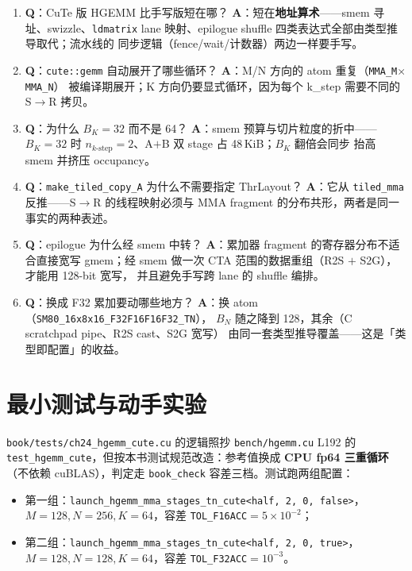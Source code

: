 \begin{enumerate}
  \item \textbf{Q}：CuTe 版 HGEMM 比手写版短在哪？
        \textbf{A}：短在\textbf{地址算术}——smem 寻址、swizzle、\texttt{ldmatrix}
        lane 映射、epilogue shuffle 四类表达式全部由类型推导取代；流水线的
        同步逻辑（fence/wait/计数器）两边一样要手写。
  \item \textbf{Q}：\texttt{cute::gemm} 自动展开了哪些循环？
        \textbf{A}：M/N 方向的 atom 重复（\texttt{MMA\_M}$\times$\texttt{MMA\_N}）
        被编译期展开；K 方向仍要显式循环，因为每个 k\_step 需要不同的
        S$\to$R 拷贝。
  \item \textbf{Q}：为什么 $B_K=32$ 而不是 64？
        \textbf{A}：smem 预算与切片粒度的折中——$B_K=32$ 时
        $n_{k\text{-step}}=2$、A$+$B 双 stage 占 48\,KiB；$B_K$ 翻倍会同步
        抬高 smem 并挤压 occupancy。
  \item \textbf{Q}：\texttt{make\_\allowbreak{}tiled\_\allowbreak{}copy\_\allowbreak{}A} 为什么不需要指定
        ThrLayout？
        \textbf{A}：它从 \texttt{tiled\_mma} 反推——S$\to$R 的线程映射必须与
        MMA fragment 的分布共形，两者是同一事实的两种表述。
  \item \textbf{Q}：epilogue 为什么经 smem 中转？
        \textbf{A}：累加器 fragment 的寄存器分布不适合直接宽写 gmem；经 smem
        做一次 CTA 范围的数据重组（R2S $+$ S2G），才能用 128-bit 宽写，
        并且避免手写跨 lane 的 shuffle 编排。
  \item \textbf{Q}：换成 F32 累加要动哪些地方？
        \textbf{A}：换 atom（\texttt{SM80\_\allowbreak{}16x8x16\_\allowbreak{}F32\allowbreak{}F16\allowbreak{}F16\allowbreak{}F32\_\allowbreak{}TN}），
        $B_N$ 随之降到 128，其余（C scratchpad pipe、R2S cast、S2G 宽写）
        由同一套类型推导覆盖——这是「类型即配置」的收益。
\end{enumerate}

\section{最小测试与动手实验}\label{sec:24-minitest}

\texttt{book/\allowbreak{}tests/\allowbreak{}ch24\_\allowbreak{}hgemm\_\allowbreak{}cute.cu} 的逻辑照抄 \texttt{bench/hgemm.cu}
L192 的 \texttt{test\_\allowbreak{}hgemm\_\allowbreak{}cute}，但按本书测试规范改造：参考值换成
\textbf{CPU fp64 三重循环}（不依赖 cuBLAS），判定走 \texttt{book\_check}
容差三档。测试跑两组配置：

\begin{itemize}
  \item 第一组：\texttt{launch\_\allowbreak{}hgemm\_\allowbreak{}mma\_\allowbreak{}stages\_\allowbreak{}tn\_\allowbreak{}cute\allowbreak{}<half, 2, 0, false>}，
        $M{=}128,N{=}256,K{=}64$，容差 \texttt{TOL\_F16ACC}$=5\times10^{-2}$；
  \item 第二组：\texttt{launch\_\allowbreak{}hgemm\_\allowbreak{}mma\_\allowbreak{}stages\_\allowbreak{}tn\_\allowbreak{}cute\allowbreak{}<half, 2, 0, true>}，
        $M{=}128,N{=}128,K{=}64$，容差 \texttt{TOL\_F32ACC}$=10^{-3}$。
\end{itemize}

